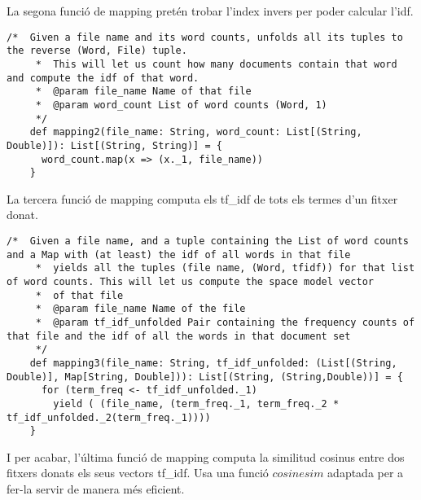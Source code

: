 \documentclass{report}
\begin{document}
La segona funció de mapping pretén trobar l'index invers per poder calcular l'idf.

\begin{lstlisting}[style=scalaHighlight]
    /*  Given a file name and its word counts, unfolds all its tuples to the reverse (Word, File) tuple.
     *  This will let us count how many documents contain that word and compute the idf of that word.
     *  @param file_name Name of that file
     *  @param word_count List of word counts (Word, 1)
     */
    def mapping2(file_name: String, word_count: List[(String, Double)]): List[(String, String)] = {
      word_count.map(x => (x._1, file_name))
    }
\end{lstlisting}

La tercera funció de mapping computa els tf\_idf de tots els termes d'un fitxer donat.

\begin{lstlisting}[style=scalaHighlight]
/*  Given a file name, and a tuple containing the List of word counts and a Map with (at least) the idf of all words in that file
     *  yields all the tuples (file name, (Word, tfidf)) for that list of word counts. This will let us compute the space model vector
     *  of that file
     *  @param file_name Name of the file
     *  @param tf_idf_unfolded Pair containing the frequency counts of that file and the idf of all the words in that document set
     */
    def mapping3(file_name: String, tf_idf_unfolded: (List[(String, Double)], Map[String, Double])): List[(String, (String,Double))] = {
      for (term_freq <- tf_idf_unfolded._1)
        yield ( (file_name, (term_freq._1, term_freq._2 * tf_idf_unfolded._2(term_freq._1))))
    }
\end{lstlisting}

\newpage

I per acabar, l'última funció de mapping computa la similitud cosinus entre dos fitxers donats els seus vectors tf\_idf. Usa una funció $cosinesim$ adaptada per a fer-la servir de manera més eficient.
\end{document}
